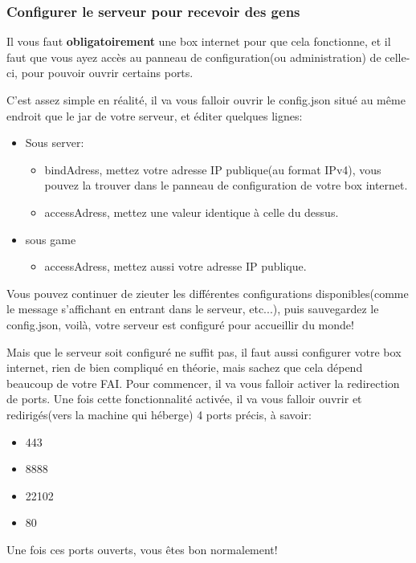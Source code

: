 \documentclass{article}
\begin{document}
\subsubsection{Configurer le serveur pour recevoir des gens}
Il vous faut \textbf{obligatoirement} une box internet pour que cela fonctionne, et il faut que vous ayez accès au panneau de configuration(ou administration) de celle-ci, pour pouvoir ouvrir certains ports.\newline\newline

C'est assez simple en réalité, il va vous falloir ouvrir le config.json situé au même endroit que le jar de votre serveur, et éditer quelques lignes:
\begin{itemize}
	\item Sous server:
		\begin{itemize}
			\item bindAdress, mettez votre adresse IP publique(au format IPv4), vous pouvez la trouver dans le panneau de configuration de votre box internet.
			\item accessAdress, mettez une valeur identique à celle du dessus.
		\end{itemize}
	\item sous game
		\begin{itemize}
			\item accessAdress, mettez aussi votre adresse IP publique.
		\end{itemize}
\end{itemize}
Vous pouvez continuer de zieuter les différentes configurations disponibles(comme le message s'affichant en entrant dans le serveur, etc...), puis sauvegardez le config.json, voilà, votre serveur est configuré pour accueillir du monde!\newline\newline

Mais que le serveur soit configuré ne suffit pas, il faut aussi configurer votre box internet, rien de bien compliqué en théorie, mais sachez que cela dépend beaucoup de votre FAI.\newline
Pour commencer, il va vous falloir activer la redirection de ports. Une fois cette fonctionnalité activée, il va vous falloir ouvrir et redirigés(vers la machine qui héberge) 4 ports précis, à savoir:
\begin{itemize}
	\item 443
	\item 8888
	\item 22102
	\item 80
\end{itemize}
Une fois ces ports ouverts, vous êtes bon normalement!
\end{document}
